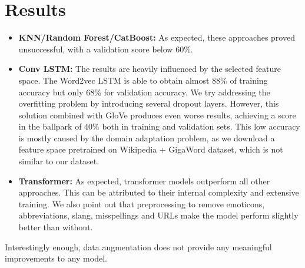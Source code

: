 \documentclass{article}
\begin{document}
\section{Results}
\begin{itemize}
		\item \textbf{KNN/Random Forest/CatBoost:} As expected, these approaches proved unsuccessful, with a validation score below 60\%.
		\item \textbf{Conv LSTM:} The results are heavily influenced by the selected feature space. The Word2vec LSTM is able to obtain almost 88\% of training accuracy but only 68\% for validation accuracy. We try addressing the overfitting problem by introducing several dropout layers. However, this solution combined with GloVe produces even worse results, achieving a score in the ballpark of 40\% both in training and validation sets. This low accuracy is mostly caused by the domain adaptation  problem, as we download a feature space pretrained on Wikipedia + GigaWord dataset, which is not similar to our dataset. 
		\item \textbf{Transformer:} As expected, transformer models outperform all other approaches. This can be attributed to their internal complexity and extensive training\cite{Chefer_2021_CVPR}. We also point out that preprocessing to remove emoticons, abbreviations, slang, misspellings and URLs make the model perform slightly better than without.
\end{itemize}
	
Interestingly enough, data augmentation does not provide any meaningful improvements to any model.
\end{document}
